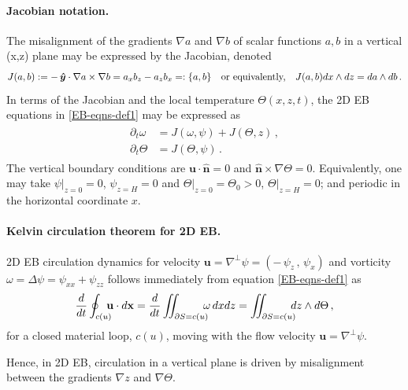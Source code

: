 \documentclass[11pt, oneside]{article}   	%
\numberwithin{equation}{section}
\theoremstyle{plain}
\theoremstyle{definition}
\theoremstyle{remark}
\newcommand{\<}{\langle}
\renewcommand{\>}{\rangle}
\def\bx{{\bf x}}
\def\p{{\partial}}
\def\bu{\mathbf{u}}
\newcommand{\wh}[1]{\widehat{#1}}
\newcommand{\bs}[1]{\boldsymbol{#1}}
\newcommand{\mbf}[1]{\mathbf{#1}}
\begin{document}
\paragraph{Jacobian notation.}
The misalignment of the gradients $\nabla a$ and $\nabla b$ of scalar functions $a,b$ in a vertical (x,z) plane may be expressed by the Jacobian, denoted
\begin{align}
J(a,b):=-\,\bs{\hat{y}}\cdot \nabla a\times \nabla b = a_x b_z-a_z b_x =: \{a,b\}
\quad\hbox{or equivalently,}\quad
J(a,b)dx\wedge dz = da\wedge db\,.
\label{def-Jac}
\end{align}
%
In terms of the Jacobian and the local temperature $\Theta(x,z,t)$, the 2D EB equations in \eqref{EB-eqns-def1} may be expressed as
%
\begin{align}
\begin{split}
\partial_t \omega  &= J(\omega,\psi) + J(\Theta,z)  \,,
\\
\partial_t \Theta &= J(\Theta, \psi )
\,.
\end{split}
\label{EB-eqns-def3}
\end{align}
The vertical boundary conditions are $\bu\cdot\bs{\wh{n}} = 0 $ and $\bs{\wh{n}}\times \nabla \Theta = 0$. Equivalently, one may take  $\psi\big|_{z=0}=0$, $\psi_{z=H}=0$ 
and $\Theta\big|_{z=0}=\Theta_0>0$,  $\Theta\big|_{z=H}=0$; and periodic in the horizontal coordinate $x$. 

\paragraph{Kelvin circulation theorem for 2D EB.}
2D EB circulation dynamics for velocity 
$\bu=\nabla^\perp\psi =  (-\,\psi_z\,,\, \psi_x)$ and  vorticity $\omega=\Delta \psi= \psi_{xx}+\psi_{zz}$ 
 follows immediately from equation \eqref{EB-eqns-def1} as 
\begin{align} 
\frac{d}{dt}\oint_{c(u)} \!\!\!\! \mbf{u}\cdot d\bx
= 
\frac{d}{dt}\int\!\!\!\!\int_{\p S = c(u)} \!\!\!\! \omega \,dxdz
=  \int\!\!\!\!\int_{\p S = c(u)} \!\!\!\!  dz\wedge d{\Theta}
\,,\label{EB-KelvinThm}
\end{align}
for a closed material loop, $c(u)$, moving with the flow velocity $\bu=\nabla^\perp\psi$. 
\smallskip

Hence, in 2D EB, circulation in a vertical plane is driven by misalignment between the gradients $\nabla z$ and $\nabla {\Theta}$. 
\end{document}
